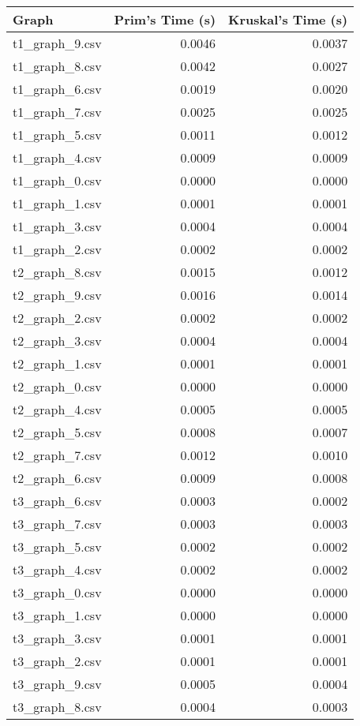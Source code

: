 \documentclass{article}
\begin{document}
\begin{tabular}{|l|r|r|}
\hline
\textbf{Graph} & \textbf{Prim's Time (s)} & \textbf{Kruskal's Time (s)} \\
\hline
t1\_graph\_9.csv & 0.0046 & 0.0037 \\
t1\_graph\_8.csv & 0.0042 & 0.0027 \\
t1\_graph\_6.csv & 0.0019 & 0.0020 \\
t1\_graph\_7.csv & 0.0025 & 0.0025 \\
t1\_graph\_5.csv & 0.0011 & 0.0012 \\
t1\_graph\_4.csv & 0.0009 & 0.0009 \\
t1\_graph\_0.csv & 0.0000 & 0.0000 \\
t1\_graph\_1.csv & 0.0001 & 0.0001 \\
t1\_graph\_3.csv & 0.0004 & 0.0004 \\
t1\_graph\_2.csv & 0.0002 & 0.0002 \\
t2\_graph\_8.csv & 0.0015 & 0.0012 \\
t2\_graph\_9.csv & 0.0016 & 0.0014 \\
t2\_graph\_2.csv & 0.0002 & 0.0002 \\
t2\_graph\_3.csv & 0.0004 & 0.0004 \\
t2\_graph\_1.csv & 0.0001 & 0.0001 \\
t2\_graph\_0.csv & 0.0000 & 0.0000 \\
t2\_graph\_4.csv & 0.0005 & 0.0005 \\
t2\_graph\_5.csv & 0.0008 & 0.0007 \\
t2\_graph\_7.csv & 0.0012 & 0.0010 \\
t2\_graph\_6.csv & 0.0009 & 0.0008 \\
t3\_graph\_6.csv & 0.0003 & 0.0002 \\
t3\_graph\_7.csv & 0.0003 & 0.0003 \\
t3\_graph\_5.csv & 0.0002 & 0.0002 \\
t3\_graph\_4.csv & 0.0002 & 0.0002 \\
t3\_graph\_0.csv & 0.0000 & 0.0000 \\
t3\_graph\_1.csv & 0.0000 & 0.0000 \\
t3\_graph\_3.csv & 0.0001 & 0.0001 \\
t3\_graph\_2.csv & 0.0001 & 0.0001 \\
t3\_graph\_9.csv & 0.0005 & 0.0004 \\
t3\_graph\_8.csv & 0.0004 & 0.0003 \\
\hline
\end{tabular}
\end{document}
